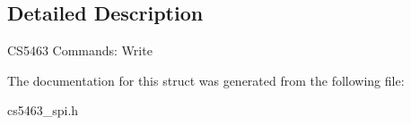 \subsection{Detailed Description}
C\-S5463 Commands\-: Write 

The documentation for this struct was generated from the following file\-:\begin{DoxyCompactItemize}
\item 
cs5463\-\_\-spi.\-h\end{DoxyCompactItemize}
